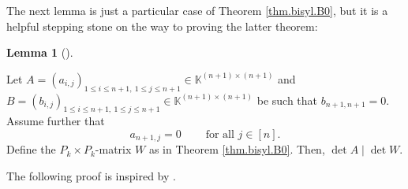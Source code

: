 \documentclass[numbers=enddot,12pt,final,onecolumn,notitlepage]{scrartcl}%
\theoremstyle{definition}
\newtheorem{lem}[theo]{Lemma}
\newenvironment{lemma}[1][]
{\begin{lem}[#1]\begin{leftbar}}
{\end{leftbar}\end{lem}}
\begin{document}
The next lemma is just a particular case of Theorem \ref{thm.bisyl.B0}, but it
is a helpful stepping stone on the way to proving the latter theorem:

\begin{lemma}
\label{lem.bisyl.AdB0}Let $A=\left(  a_{i,j}\right)  _{1\leq i\leq n+1,\ 1\leq
j\leq n+1}\in\mathbb{K}^{\left(  n+1\right)  \times\left(  n+1\right)  }$ and
$B=\left(  b_{i,j}\right)  _{1\leq i\leq n+1,\ 1\leq j\leq n+1}\in
\mathbb{K}^{\left(  n+1\right)  \times\left(  n+1\right)  }$ be such that
$b_{n+1,n+1}=0$. Assume further that%
\begin{equation}
a_{n+1,j}=0\ \ \ \ \ \ \ \ \ \ \text{for all }j\in\left[  n\right]  .
\label{eq.lem.bisyl.AdB0.ass-j}%
\end{equation}
Define the $P_{k}\times P_{k}$-matrix $W$ as in Theorem \ref{thm.bisyl.B0}.
Then, $\det A\mid\det W$.
\end{lemma}

The following proof is inspired by \cite[proof of Theorem 10]{GriOlv18}.
\end{document}
